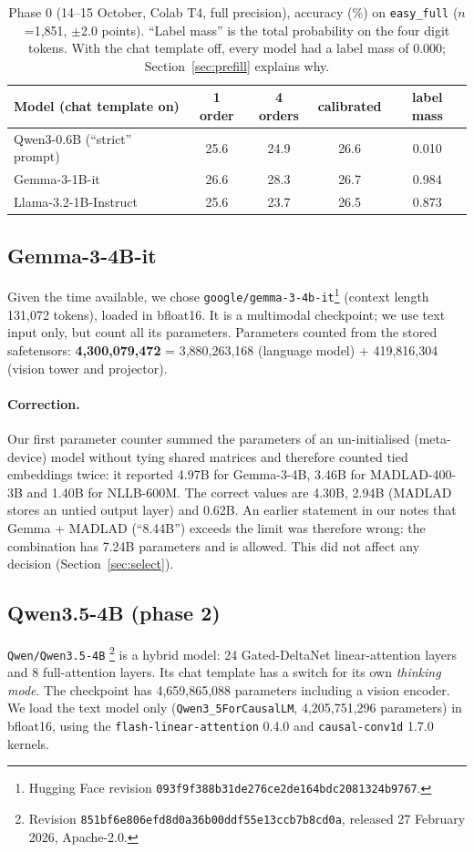 \documentclass[10pt,a4paper]{article}
\begin{document}
\begin{table}[h]
\centering\small
\begin{tabular}{lcccc}
\toprule
Model (chat template on) & 1 order & 4 orders & calibrated & label mass\\
\midrule
Qwen3-0.6B (``strict'' prompt) & 25.6 & 24.9 & 26.6 & 0.010\\
Gemma-3-1B-it & 26.6 & 28.3 & 26.7 & 0.984\\
Llama-3.2-1B-Instruct & 25.6 & 23.7 & 26.5 & 0.873\\
\bottomrule
\end{tabular}
\caption{Phase 0 (14--15 October, Colab T4, full precision), accuracy (\%) on \texttt{easy\_full} ($n$=1,851,
$\pm$2.0 points). ``Label mass'' is the total probability on the four digit tokens. With the chat template off,
every model had a label mass of 0.000; Section~\ref{sec:prefill} explains why.}
\label{tab:phase0}
\end{table}

\subsection{Gemma-3-4B-it}\label{sec:params}
Given the time available, we chose \texttt{google/gemma-3-4b-it}\footnote{Hugging Face revision
\texttt{093f9f388b31de276ce2de164bdc2081324b9767}.} (context length 131,072 tokens), loaded in bfloat16. It is a
multimodal checkpoint; we use text input only, but count all its parameters.
Parameters counted from the stored safetensors: \textbf{4,300,079,472} = 3,880,263,168 (language model) + 419,816,304
(vision tower and projector).

\paragraph{Correction.} Our first parameter counter summed the parameters of an un-initialised (meta-device)
model without tying shared matrices and therefore counted tied embeddings twice: it reported 4.97B for Gemma-3-4B,
3.46B for MADLAD-400-3B and 1.40B for NLLB-600M. The correct values are 4.30B, 2.94B (MADLAD stores an untied
output layer) and 0.62B. An earlier statement in our notes that Gemma + MADLAD (``8.44B'') exceeds the limit was
therefore wrong: the combination has 7.24B parameters and is allowed. This did not affect any decision
(Section~\ref{sec:select}).

\subsection{Qwen3.5-4B (phase 2)}\label{sec:qwen}
\texttt{Qwen/Qwen3.5-4B} \cite{qwen35}\footnote{Revision \texttt{851bf6e806efd8d0a36b00ddf55e13ccb7b8cd0a}, released
27 February 2026, Apache-2.0.} is a hybrid model: 24 Gated-DeltaNet linear-attention layers and 8 full-attention
layers. Its chat template has a switch for its own \emph{thinking mode}. The checkpoint has 4,659,865,088 parameters
including a vision encoder. We load the text model only (\texttt{Qwen3\_5ForCausalLM}, 4,205,751,296 parameters) in
bfloat16, using the \texttt{flash-linear-attention} 0.4.0 and \texttt{causal-conv1d} 1.7.0 kernels.
\end{document}
